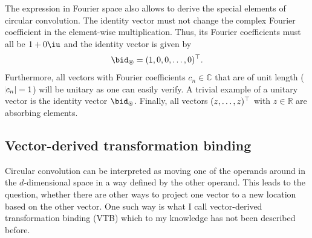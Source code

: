 The expression in Fourier space also allows to derive the special elements of circular convolution.
The identity vector must not change the complex Fourier coefficient in the element-wise multiplication.
Thus, its Fourier coefficients must all be $1 + 0\iu$ and the identity vector is given by
\begin{equation}
    \bid_{\circledast} = (1, 0, 0, \dotsc, 0)\Tr \text{.}
\end{equation}
Furthermore, all vectors with Fourier coefficients $c_n \in \mathbb{C}$ that are of unit length ($\abs{c_n} = 1$) will be unitary as one can easily verify.
A trivial example of a unitary vector is the identity vector $\bid_{\circledast}$.
Finally, all vectors $(z, \dotsc, z)^{\top}$ with $z \in \mathbb{R}$ are absorbing elements.

\subsection{Vector-derived transformation binding}
Circular convolution can be interpreted as moving one of the operands around in the $d$-dimensional space in a way defined by the other operand.
This leads to the question, whether there are other ways to project one vector to a new location based on the other vector.
One such way is what I call vector-derived transformation binding (VTB) which to my knowledge has not been described before.
